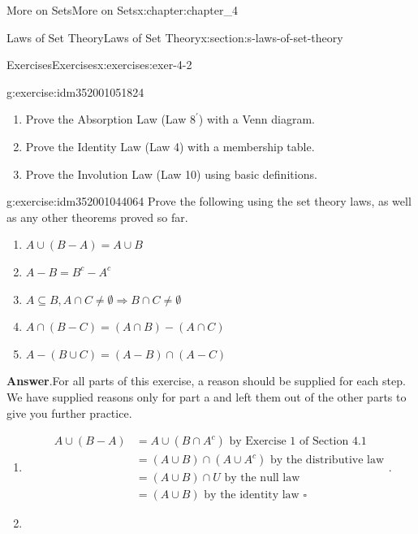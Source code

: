 \documentclass[oneside,10pt,]{book}
\newcommand{\blocktitlefont}{\relax}
\begin{document}
\begin{chapterptx}{More on Sets}{}{More on Sets}{}{}{x:chapter:chapter_4}
\begin{sectionptx}{Laws of Set Theory}{}{Laws of Set Theory}{}{}{x:section:s-laws-of-set-theory}
\begin{exercises-subsection}{Exercises}{}{Exercises}{}{}{x:exercises:exer-4-2}
\begin{divisionexercise}{2}{}{}{g:exercise:idm352001051824}
%
\begin{enumerate}[label=(\alph*)]
\item{}Prove the Absorption Law (Law \(8^{\prime}\)) with a Venn diagram.%
\item{}Prove the Identity Law (Law 4) with a membership table.%
\item{}Prove the Involution Law (Law 10) using basic definitions.%
\end{enumerate}
%
\end{divisionexercise}%
\begin{divisionexercise}{3}{}{}{g:exercise:idm352001044064}%
Prove the following using the set theory laws, as well as any other theorems proved so far.%
\par
%
\begin{enumerate}[label=(\alph*)]
\item{}\(\displaystyle A \cup  (B - A) = A \cup  B\)%
\item{}\(\displaystyle A - B = B^c - A ^c\)%
\item{}\(\displaystyle A\subseteq B, A\cap C \neq \emptyset  \Rightarrow  B\cap C \neq \emptyset\)%
\item{}\(\displaystyle A\cap (B - C) = (A\cap B) - (A\cap C)\)%
\item{}\(\displaystyle A - (B \cup  C) = (A - B)\cap (A - C)\)%
\end{enumerate}
%
\par\smallskip%
\noindent\textbf{\blocktitlefont Answer}.\hypertarget{g:answer:idm352001039696}{}\quad{}For all parts of this exercise, a reason should be supplied for each step. We have supplied reasons only for part a and left them out of the other parts to give you further practice.%
\par
%
\begin{enumerate}[label=(\alph*)]
\item{}%
\begin{equation*}
\begin{split}
A \cup (B-A)&=A\cup (B \cap A^c) \textrm{  by Exercise 1 of Section 4.1}\\
& =(A\cup B)\cap (A\cup A^c) \textrm{  by the distributive law}\\
&=(A\cup B)\cap U \textrm{  by the null law}\\
&=(A\cup B) \textrm{  by the identity law }  \square
\end{split}\text{.}
\end{equation*}
%
\item{}%
\begin{equation*}

\end{equation*}
\end{enumerate}
\end{divisionexercise}
\end{exercises-subsection}
\end{sectionptx}
\end{chapterptx}
\end{document}
